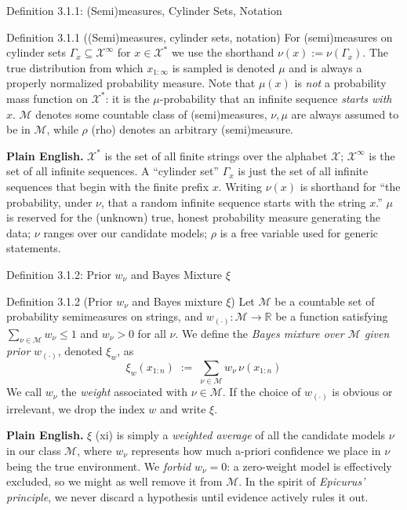 \documentclass[aspectratio=169,10pt]{beamer}
\newcommand{\R}{\mathbb{R}}
\newcommand{\X}{\mathcal{X}}
\newcommand{\Mcal}{\mathcal{M}}
\begin{document}
\begin{frame}{Definition 3.1.1: (Semi)measures, Cylinder Sets, Notation}
  \begin{block}{Definition 3.1.1 ((Semi)measures, cylinder sets, notation)}
    For (semi)measures on cylinder sets $\Gamma_x \subseteq \X^\infty$ for
    $x \in \X^{*}$ we use the shorthand $\nu(x) := \nu(\Gamma_x)$. The true
    distribution from which $x_{1:\infty}$ is sampled is denoted $\mu$ and is
    always a properly normalized probability measure. Note that $\mu(x)$ is
    \emph{not} a probability mass function on $\X^{*}$: it is the
    $\mu$-probability that an infinite sequence \emph{starts with} $x$.
    $\Mcal$ denotes some countable class of (semi)measures, $\nu, \mu$ are
    always assumed to be in $\Mcal$, while $\rho$ (rho) denotes an arbitrary
    (semi)measure.
  \end{block}
  \textbf{Plain English.} $\X^{*}$ is the set of all finite strings over the
  alphabet $\X$; $\X^\infty$ is the set of all infinite sequences. A
  ``cylinder set'' $\Gamma_x$ is just the set of all infinite sequences that
  begin with the finite prefix $x$. Writing $\nu(x)$ is shorthand for ``the
  probability, under $\nu$, that a random infinite sequence starts with the
  string $x$.'' $\mu$ is reserved for the (unknown) true, honest probability
  measure generating the data; $\nu$ ranges over our candidate models; $\rho$
  is a free variable used for generic statements.
\end{frame}

\begin{frame}{Definition 3.1.2: Prior $w_\nu$ and Bayes Mixture $\xi$}
  \begin{block}{Definition 3.1.2 (Prior $w_\nu$ and Bayes mixture $\xi$)}
    Let $\Mcal$ be a countable set of probability semimeasures on strings, and
    $w_{(\cdot)} : \Mcal \to \R$ be a function satisfying
    $\sum_{\nu\in\Mcal} w_\nu \le 1$ and $w_\nu > 0$ for all $\nu$. We define
    the \emph{Bayes mixture over $\Mcal$ given prior} $w_{(\cdot)}$, denoted
    $\xi_w$, as
    \[
      \xi_w(x_{1:n}) \; := \; \sum_{\nu \in \Mcal} w_\nu\, \nu(x_{1:n})
    \]
    We call $w_\nu$ the \emph{weight} associated with $\nu\in\Mcal$. If the
    choice of $w_{(\cdot)}$ is obvious or irrelevant, we drop the index $w$
    and write $\xi$.
  \end{block}
  \textbf{Plain English.} $\xi$ (xi) is simply a \emph{weighted average} of
  all the candidate models $\nu$ in our class $\Mcal$, where $w_\nu$
  represents how much a-priori confidence we place in $\nu$ being the true
  environment. We \emph{forbid} $w_\nu=0$: a zero-weight model is effectively
  excluded, so we might as well remove it from $\Mcal$. In the spirit of
  \emph{Epicurus' principle}, we never discard a hypothesis until evidence
  actively rules it out.
\end{frame}
\end{document}
